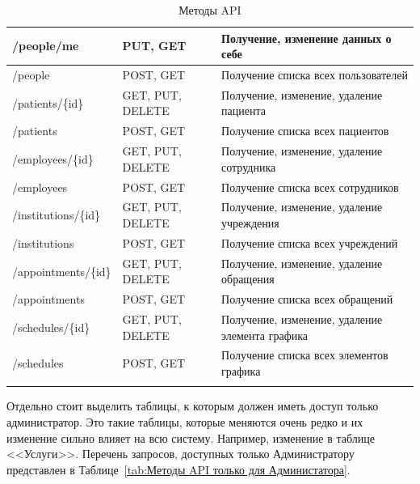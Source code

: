 \documentclass[a4paper,article]{article}
\begin{document}
\begin{sloppypar}
\begin{xltabular}{\textwidth} { |
        >{\hsize} X |
        >{\hsize} X |
        >{\hsize} X | }
        \hline
        /people/me
        & PUT, GET
        & Получение, изменение данных о себе \\

        \hline
        /people
        & POST, GET
        & Получение списка всех пользователей \\

        \hline
        /patients/\{id\}
        & GET, PUT, DELETE
        & Получение, изменение, удаление пациента \\

        \hline
        /patients
        & POST, GET
        & Получение списка всех пациентов \\

        \hline
        /employees/\{id\}
        & GET, PUT, DELETE
        & Получение, изменение, удаление сотрудника \\

        \hline
        /employees
        & POST, GET
        & Получение списка всех сотрудников \\

        \hline
        /institutions/\{id\}
        & GET, PUT, DELETE
        & Получение, изменение, удаление учреждения  \\

        \hline
        /institutions
        & POST, GET
        & Получение списка всех учреждений \\

        \hline
        /appointments/\{id\}
        & GET, PUT, DELETE
        & Получение, изменение, удаление обращения \\

        \hline
        /appointments
        & POST, GET
        & Получение списка всех обращений \\

        \hline
        /schedules/\{id\}
        & GET, PUT, DELETE
        & Получение, изменение, удаление элемента графика \\

        \hline
        /schedules
        & POST, GET
        & Получение списка всех элементов графика \\

        \hline

        \caption{\centering Методы API}

        \label{tab:Методы API}
    \end{xltabular}

    Отдельно стоит выделить таблицы, к которым должен иметь доступ только администратор. Это такие таблицы, которые меняются очень редко и их изменение сильно влияет на всю систему. Например, изменение в таблице <<Услуги>>. Перечень запросов, доступных только Администратору представлен в Таблице~\ref{tab:Методы API только для Администатора}.
    

\end{sloppypar}
\end{document}
